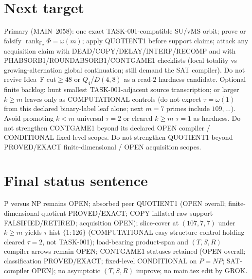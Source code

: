 \documentclass[11pt]{article}
\begin{document}
\section*{Next target}
Primary (MAIN~2058): one exact TASK-001-compatible SU/vMS orbit; prove or falsify
$\operatorname{rank}_{\mathbb F_2}\Phi=\omega(m)$; apply QUOTIENT1 before support claims;
attack any acquisition claim with
DEAD/COPY/DELAY/INTERP/RECOMP and with PHABSORB1/ROUNDABSORB1/CONTGAME1 checklists
(local totality vs growing-alternation global continuation; still demand the SAT compiler).
Do not revive Idea~F cut$\ge48$ or $Q_4$/$D(4,8)$ as a read-$2$ hardness candidate.
Optional finite backlog: hunt smallest TASK-001-adjacent source transcription;
or larger $k{\ge}m$ leaves only as COMPUTATIONAL controls (do not expect $\tau=\omega(1)$
from this declared binary-label leaf alone; next $m{=}7$ primes include $109,\ldots$).
Avoid promoting $k{<}m$ universal $\tau{=}2$ or cleared $k{\ge}m$ $\tau{=}1$ as hardness.
Do not strengthen CONTGAME1 beyond its declared OPEN compiler / CONDITIONAL fixed-level scopes.
Do not strengthen QUOTIENT1 beyond PROVED/EXACT finite-dimensional / OPEN acquisition scopes.

\section*{Final status sentence}
P versus NP remains OPEN; absorbed peer QUOTIENT1 (OPEN overall; finite-dimensional quotient
PROVED/EXACT; COPY-inflated raw support FALSIFIED/RETIRED; acquisition OPEN);
slice-cover at $(107,7,7)$ under $k{\ge}m$ yields $\tau$-hist $\{1{:}126\}$ (COMPUTATIONAL
easy-structure control holding cleared $\tau{=}2$, not TASK-001); load-bearing product-span
and $(T,S,R)$ compiler arrows remain OPEN; CONTGAME1 statuses retained (OPEN overall;
classification PROVED/EXACT; fixed-level CONDITIONAL on $P{=}NP$; SAT-compiler OPEN);
no asymptotic $(T,S,R)$ improve; no main.tex edit by GROK.
\end{document}
